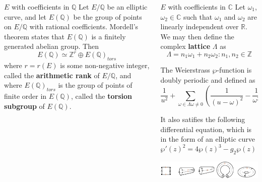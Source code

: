 \documentclass{beamer}
\newcommand{\Z}{\mathbb{Z}}
\newcommand{\Q}{\mathbb{Q}}
\begin{document}
\begin{frame}{}
\begin{columns}[t]
\begin{column}{0.245\linewidth}
\begin{block}{$E$ with coefficients in $\mathbb{Q}$}
Let $E/\Q$ be an elliptic curve, and let $E(\Q)$ be the group of points on $E/\Q$ with rational coefficients. Mordell's theorem states that $E(\Q)$ is a finitely generated abelian group. Then
$$ E(\Q) \simeq \Z^r \oplus E(\Q)_{tors} $$
where $r = r(E)$ is some non-negative integer, called the \textbf{arithmetic rank} of $E/\Q$, and where $E(\Q)_{tors}$ is the group of points of finite order in $E(\Q)$, called the \textbf{torsion subgroup} of $E(\Q)$. 
\end{block}
\end{column}%

\begin{column}{0.245\linewidth}

\begin{block}{$E$ with coefficients in $\mathbb{C}$}
Let $\omega_1$, $\omega_2 \in \mathbb{C}$ such that $\omega_1$ and $\omega_2$ are linearly independent over $\mathbb{R}$. We may then define the complex \textbf{lattice} $\Lambda$ as 
$$ \Lambda = n_1\omega_1 + n_2\omega_2 : n_1, n_2 \in \mathbb{Z} $$

The Weierstrass $\wp$-function is doubly periodic and defined as $$\frac{1}{u^2} + \sum_{\omega \in \Lambda \omega \neq 0} \left( \frac{1}{(u - \omega)^2} - \frac{1}{\omega^2} \right)$$

It also satifies the following differential equation, which is in the form of an elliptic curve $$\wp'(z)^2 = 4\wp(z)^3 - g_2\wp(z) - g_3$$ 
\begin{center}
\includegraphics[width=0.9\columnwidth]{folding}\\
\end{center}

\end{block}


\end{column}
\end{columns}
\end{frame}
\end{document}
